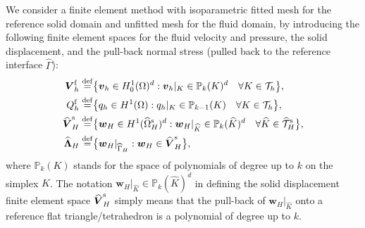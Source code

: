 \documentclass[11pt,reqno]{amsart}
\theoremstyle{definition}
\theoremstyle{plain}
\numberwithin{theorem}{section}
\numberwithin{proposition}{section}
\numberwithin{lemma}{section}
\numberwithin{equation}{section}
\newcommand{\bs}[1]{\boldsymbol{#1}}
\newcommand{\bv}{{\bs v}}
\newcommand{\bw}{{\bs w}}
\renewcommand{\(}{\bigl(}
\renewcommand{\)}{\bigr)}
\def\eqd{\stackrel{\mathrm{def}}{=}}
\begin{document}
We consider a finite element method  with isoparametric fitted mesh for the reference solid domain and unfitted mesh for the fluid domain, by introducing the following finite element spaces for the fluid velocity and pressure, the solid displacement, and the pull-back normal stress (pulled back to the reference interface $\widehat\Gamma$):
$$
\begin{aligned}
 {\bs V}_h^{\rm f} \eqd  & \big\{  {\bs v}_h \in H^1_0(\Omega)^d: \bv_h\vert_K \in \mathbb{P}_k(K)^d\quad \forall K\in {\mathcal T}_h \big\} ,\\ 
 Q_h^{\rm f} \eqd  & \big\{ q_h \in H^1(\Omega):  q_h\vert_K \in \mathbb{P}_{k-1}(K)\quad \forall K\in {\mathcal T}_h \big\},\\ 
 \widehat{\bs V}_H^{\rm s} \eqd  & \big\{  \bs w_H \in H^1(\widehat\Omega^{\rm s}_H)^d: \bw_H\vert_{\widehat K} \in \mathbb{P}_k(\widehat K)^d\quad \forall \widehat K\in \widehat{\mathcal T}_H^{\rm s} \big\},\\
 \widehat{\bs \Lambda}_H \eqd  & \big\{  \bs w_H\vert_{\widehat\Gamma_H}: \bw_H \in  \widehat{\bs V}_H^{\rm s}\big\} , 
\end{aligned}
$$
where $\mathbb{P}_k(K)$ stands for the space of polynomials of degree up to $k$ on the simplex $K$. The notation $\bw_H\vert_{\widehat K} \in \mathbb{P}_k(\widehat K)^d$ in defining the solid displacement finite element space $\widehat{\bs V}_H^{\rm s}$ simply means that the pull-back of $\bw_H|_{\widehat K}$ onto a reference flat triangle/tetrahedron is a polynomial of degree up to $k$. 
\end{document}
